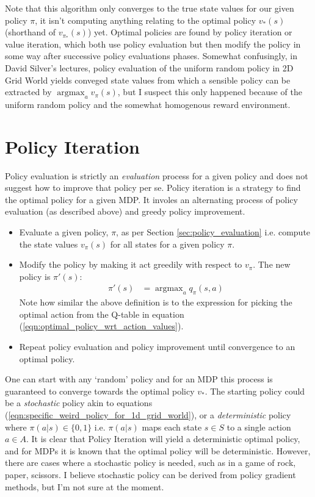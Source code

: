 \documentclass[a4paper,11pt]{article}
\DeclareMathOperator*{\argmax}{argmax}
\begin{document}
Note that this algorithm only converges to the true state values for our given policy $\pi$, it isn't computing anything relating to the optimal policy $v_{\ast}(s)$ (shorthand of $v_{\pi_\ast}(s)$) yet.  Optimal policies are found by policy iteration or value iteration, which both use policy evaluation but then modify the policy in some way after successive policy evaluations phases.  Somewhat confusingly, in David Silver's lectures, policy evaluation of the uniform random policy in 2D Grid World yields conveged state values from which a sensible policy can be extracted by $\argmax_a v_\pi(s)$, but I suspect this only happened because of the uniform random policy and the somewhat homogenous reward environment.


\section{Policy Iteration}

Policy evaluation is strictly an {\it evaluation} process for a given policy and does not suggest how to improve that policy per se.  Policy iteration is a strategy to find the optimal policy for a given MDP.  It involes an alternating process of policy evaluation (as described above) and greedy policy improvement.

\begin{itemize}
    \item Evaluate a given policy, $\pi$, as per Section \ref{sec:policy_evaluation} i.e. compute the state values $v_{\pi}(s)$ for all states for a given policy $\pi$.
    \item Modify the policy by making it act greedily with respect to $v_{\pi}$.  The new policy is $\pi'(s)$:
    \begin{equation} \label{eqn:modified_policy_from_policy_iteration}
    \begin{split}
        \pi'(s) &= \argmax_a q_{\pi}(s,a)
    \end{split}
    \end{equation}
    Note how similar the above definition is to the expression for picking the optimal action from the Q-table in equation (\ref{eqn:optimal_policy_wrt_action_values}).  
    \item Repeat policy evaluation and policy improvement until convergence to an optimal policy.
\end{itemize}

One can start with any `random' policy and for an MDP this process is guaranteed to converge towards the optimal policy $v_\ast$.  The starting policy could be a {\it stochastic} policy akin to equations (\ref{eqn:specific_weird_policy_for_1d_grid_world}), or a {\it deterministic} policy where $\pi(a|s) \in \{0,1\}$ i.e. $\pi(a|s)$ maps each state $s \in S$ to a single action $a \in A$.  It is clear that Policy Iteration will yield a deterministic optimal policy, and for MDPs it is known that the optimal policy will be deterministic.  However, there are cases where a stochastic policy is needed, such as in a game of rock, paper, scissors.  I believe stochastic policy can be derived from policy gradient methods, but I'm not sure at the moment.
\end{document}
